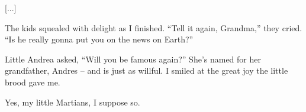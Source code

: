 \documentclass[11pt,a4paper]{article}
\newcommand{\storybreak}{%
  \par\vspace{0.6\baselineskip}
  \begin{center}\color{storyblue}\small *\enspace *\enspace *\end{center}
  \vspace{0.3\baselineskip}\noindent\ignorespaces
}
\begin{document}
[...]

\storybreak

The kids squealed with delight as I finished. “Tell it again, Grandma,” they cried. “Is he really gonna put you on the news on Earth?”

Little Andrea asked, “Will you be famous again?” She’s named for her grandfather, Andres – and is just as willful. I smiled at the great joy the little brood gave me.

Yes, my little Martians, I suppose so.
\end{document}
